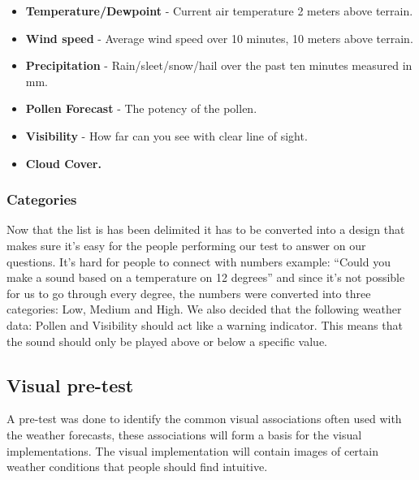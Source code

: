 \begin{itemize}
     \item \textbf{Temperature/Dewpoint} - Current air temperature 2 meters above terrain.
     \item \textbf{Wind speed} - Average wind speed over 10 minutes, 10 meters above terrain.
     \item \textbf{Precipitation} - Rain/sleet/snow/hail over the past ten minutes measured in mm.
     \item \textbf{Pollen Forecast} - The potency of the pollen.
     \item \textbf{Visibility} - How far can you see with clear line of sight.
     \item \textbf{Cloud Cover.}
 \end{itemize}



\subsubsection{Categories} %
\label{ssub:categories}

Now that the list is has been delimited it has to be converted into a design that makes sure it’s easy for the people performing our test to answer on our questions. 
It’s hard for people to connect with numbers example: “Could you make a sound based on a temperature on 12 degrees” and since it’s not possible for us to go through every degree, the numbers were converted into three categories: Low, Medium and High. 
We also decided that the following weather data: Pollen and Visibility should act like a warning indicator. 
This means that the sound should only be played above or below a specific value.



\subsection{Visual pre-test} %
\label{sub:visual_pre_test}

A pre-test was done to identify the common visual associations often used with the weather forecasts, these associations will form a basis for the visual implementations. 
The visual implementation will contain images of certain weather conditions that people should find intuitive.

